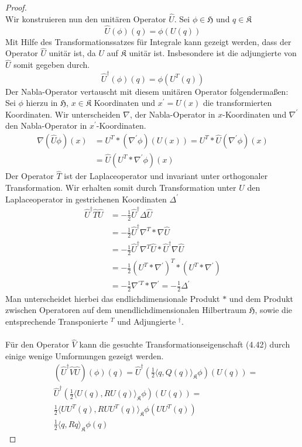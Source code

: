 \documentclass[11pt,a4paper,leqno]{report}
\numberwithin{equation}{chapter}
\begin{document}
\begin{proof}
\begin{equation*}
	\end{equation*}
	Wir konstruieren nun den unit\"aren Operator $\hat{U}$. Sei $\phi\in\mathfrak{H}$ und $q\in\mathfrak{K}$
	\begin{equation*}
		\hat{U}(\phi)(q)=\phi(U(q))
	\end{equation*}
	Mit Hilfe des Transformationssatzes f\"ur Integrale kann gezeigt werden, dass der Operator $\hat{U}$ unit\"ar ist, da $U$ auf $\mathfrak{K}$ unit\"ar ist. Insbesondere ist die adjungierte von $\hat{U}$ somit gegeben durch.	
	\begin{equation*}
		\hat{U}^\dagger(\phi)(q)=\phi(U^T(q))
	\end{equation*}
	Der Nabla-Operator vertauscht mit diesem unit\"aren Operator folgendermaßen:\\
	Sei $\phi$ hierzu in $\mathfrak{H}$, $x\in \mathfrak{K}$ Koordinaten und $x^{'} = U(x)$ die transformierten Koordinaten.  Wir unterscheiden $\nabla$, der Nabla-Operator in $x$-Koordinaten und $\nabla^{'}$ den Nabla-Operator in $x^{'}$-Koordinaten. 
	\begin{align}
		\nabla (\hat{U}\phi)(x) &= U^T * (\nabla^{'} \phi) (U(x)) = U^T * \hat{U}(\nabla^{'} \phi) (x)\\&= \hat{U}(U^T * \nabla^{'} \phi) (x)
	\end{align}
	Der Operator $\hat{T}$ ist der Laplaceoperator und invariant unter orthogonaler Transformation. Wir erhalten somit durch Transformation unter $\hat{U}$ den Laplaceoperator in gestrichenen Koordinaten $\Delta^{'}$
	\begin{align*}
		\hat{U}^\dagger\hat{T}\hat{U} &= -\frac{1}{2}\hat{U}^\dagger\Delta\hat{U}\\ &=-\frac{1}{2}\hat{U}^\dagger\nabla^T * \nabla \hat{U}\\
		&=-\frac{1}{2}\hat{U}^\dagger\nabla^T\hat{U} * \hat{U}^\dagger\nabla \hat{U}\\
		&=-\frac{1}{2}(U^T*\nabla^{'})^T*(U^T*\nabla^{'})\\
		&=-\frac{1}{2}\nabla^{'T}*\nabla^{'} = -\frac{1}{2}\Delta^{'}
	\end{align*}
	Man unterscheidet hierbei das endlichdimensionale Produkt $*$ und dem Produkt zwischen Operatoren auf dem unendlichdimensionalen Hilbertraum $\mathfrak{H}$, sowie die entsprechende Transponierte $^T$ und Adjungierte $^\dagger$.\\  
	\\ 
	F\"ur den Operator $\hat{V}$ kann die gesuchte Transformationseigenschaft (4.42) durch einige wenige Umformungen gezeigt werden.
	\begin{align*}
		&(\hat{U}^\dagger\hat{V}\hat{U})(\phi)(q)= \hat{U}^\dagger(\frac{1}{2}\langle q, Q(q)\rangle_{\mathfrak{K}}\phi)(U(q))=\\
		&\hat{U}^\dagger(\frac{1}{2}\langle U(q), R U(q)\rangle_{\mathfrak{K}}\phi)(U(q))=\\
		&\frac{1}{2}\langle  UU^T(q), R  UU^T(q)\rangle_{\mathfrak{K}}\phi(U U^T(q))\\
		&\frac{1}{2}\langle q, R q\rangle_{\mathfrak{K}}\phi(q)
	\end{align*}

\end{proof}
\end{document}
